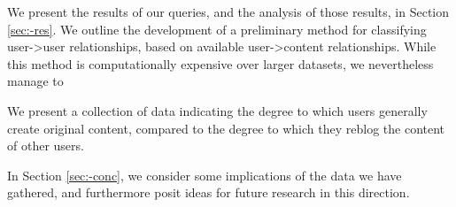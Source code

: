 We present the results of our queries, and the analysis of those results, 
in Section \ref{sec:-res}.  We outline the development of a preliminary 
method for classifying user->user relationships, based on available 
user->content relationships.  While this method is computationally 
expensive over larger datasets, we nevertheless manage to 

We present a collection of data indicating the degree to which users 
generally create original content, compared to the degree to which they 
reblog the content of other users.


In Section \ref{sec:-conc}, we consider some implications of the data 
we have gathered, and furthermore posit ideas for future research in 
this direction.






